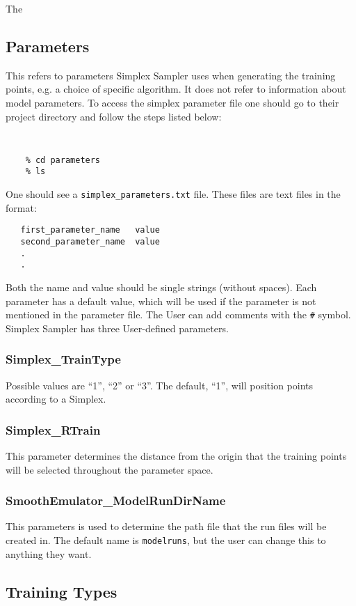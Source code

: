 \documentclass[main.tex]{subfiles}
\begin{document}
The 

\subsection{Parameters}

This refers to parameters Simplex Sampler uses when generating the training points, e.g. a choice of specific algorithm. It does not refer to information about model parameters. To access the simplex parameter file one should go to their project directory and follow the steps listed below:

{\tt
\begin{verbatim}
    % cd parameters
    % ls
\end{verbatim}
}
One should see a {\tt{simplex\_parameters.txt}} file.  These files are text files in the format:\\
{\tt\begin{verbatim}
   first_parameter_name   value
   second_parameter_name  value
   .
   .
   \end{verbatim}
}
Both the name and value should be single strings (without spaces). Each parameter has a default value, which will be used if the parameter is not mentioned in the parameter file. The User can add comments with the {\tt \#} symbol. Simplex Sampler has three User-defined parameters.
    
\subsubsection{Simplex\_TrainType}
Possible values are ``1'', ``2'' or ``3''. The default, ``1'', will position points according to a Simplex. 

\subsubsection{Simplex\_RTrain}
This parameter determines the distance from the origin that the training points will be selected throughout the parameter space. 

\subsubsection{SmoothEmulator\_ModelRunDirName}
This parameters is used to determine the path file that the run files will be created in. The default name is {\tt{modelruns}}, but the user can change this to anything they want.

\subsection{Training Types}
\end{document}
